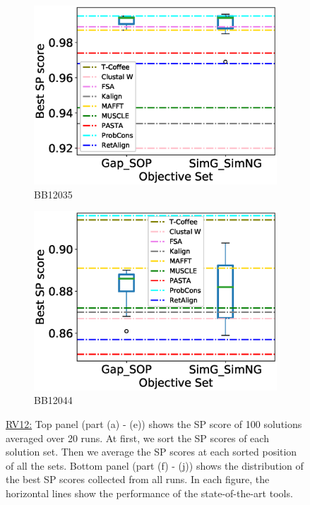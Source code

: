 \begin{figure}[!htbp]
\begin{adjustwidth}{-1.5cm}{-1cm}
\begin{subfigure}{0.22\textwidth}
			\includegraphics[width=\columnwidth]{Figure/summary/precomputedInit/Balibase/BB12035_objset_pairs_rank_2}
			\caption{BB12035}
		\end{subfigure}
		\begin{subfigure}{0.22\textwidth}
			\includegraphics[width=\columnwidth]{Figure/summary/precomputedInit/Balibase/BB12044_objset_pairs_rank_2}
			\caption{BB12044}
		\end{subfigure}
	\end{adjustwidth}
		\caption[SP score results on RV12]{\underline{RV12:} Top panel (part (a) - (e)) shows the SP score of 100 solutions averaged over 20 runs. At first, we sort the SP scores of each solution set. Then we average the SP scores at each sorted position of all the sets. Bottom panel (part (f) - (j)) shows the distribution of the best SP scores collected from all runs. In each figure, the horizontal lines show the performance of the state-of-the-art tools.}
		\label{fig:rv12_sp}
	
\end{figure}


